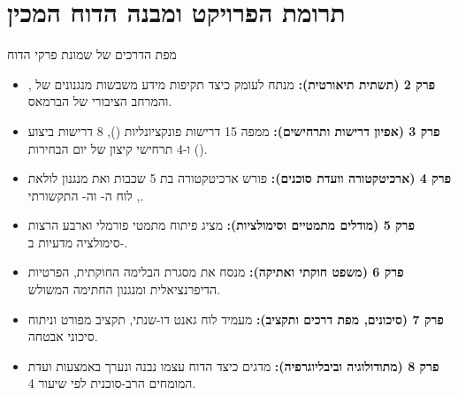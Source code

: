 \section{תרומת הפרויקט ומבנה הדוח המכין}
\begin{infobox}{מפת הדרכים של שמונת פרקי הדוח}
\begin{itemize}
  \item \textbf{פרק 2 (תשתית תיאורטית):} מנתח לעומק כיצד תקיפות מידע משבשות מנגנונים של ,  והמרחב הציבורי של הברמאס.
  \item \textbf{פרק 3 (אפיון דרישות ותרחישים):} ממפה 15 דרישות פונקציונליות (), 8 דרישות ביצוע () ו-4 תרחישי קיצון של יום הבחירות.
  \item \textbf{פרק 4 (ארכיטקטורה וועדת סוכנים):} פורש ארכיטקטורה בת 5 שכבות ואת מנגנון לולאת , לוח ה- וה- התקשורתי.
  \item \textbf{פרק 5 (מודלים מתמטיים וסימולציות):} מציג פיתוח מתמטי פורמלי וארבע הרצות סימולציה מדעיות ב-.
  \item \textbf{פרק 6 (משפט חוקתי ואתיקה):} מנסח את מסגרת הבלימה החוקתית, הפרטיות הדיפרנציאלית ומנגנון החתימה המשולש.
  \item \textbf{פרק 7 (סיכונים, מפת דרכים ותקציב):} מעמיד לוח גאנט דו-שנתי, תקציב מפורט וניתוח סיכוני אבטחה.
  \item \textbf{פרק 8 (מתודולוגיה וביבליוגרפיה):} מדגים כיצד הדוח עצמו נבנה ונערך באמצעות ועדת המומחים הרב-סוכנית לפי שיעור 4.
\end{itemize}
\end{infobox}
